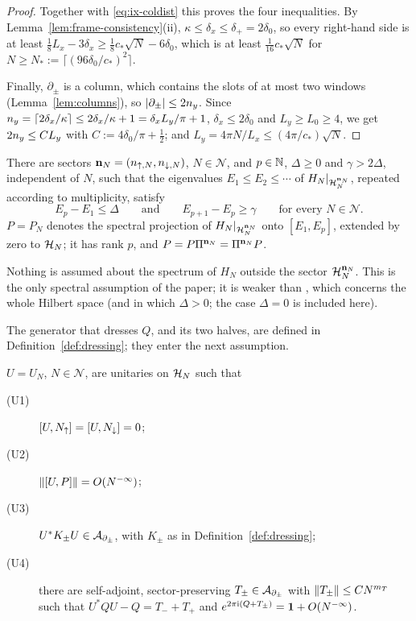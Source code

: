 \begin{proof}
Together with \eqref{eq:ix-coldist} this proves the four inequalities. By Lemma~\ref{lem:frame-consistency}(ii),
$\kappa\le\delta_x\le\delta_+=2\delta_0$, so every right-hand side is at least
$\frac18L_x-3\delta_x\ge\frac18c_*\sqrt N-6\delta_0$, which is at least $\frac1{16}c_*\sqrt N$ for
$N\ge N_*:=\lceil(96\delta_0/c_*)^2\rceil$.

Finally, $\partial_\pm$ is a column, which contains the slots of at most two windows (Lemma~\ref{lem:columns}), so
$\lvert\partial_\pm\rvert\le2n_y$. Since $n_y=\lceil2\delta_x/\kappa\rceil\le2\delta_x/\kappa+1=\delta_xL_y/\pi+1$,
$\delta_x\le2\delta_0$ and $L_y\ge L_0\ge4$, we get $2n_y\le CL_y$ with $C:=4\delta_0/\pi+\frac12$; and
$L_y=4\pi N/L_x\le(4\pi/c_*)\sqrt N$.
\end{proof}

\begin{assumption}\label{ass:gap}
There are sectors $\mathbf{n}_N=(n_{{\uparrow},N},n_{{\downarrow},N})$, $N\in\mathcal N$, and $p\in\mathbb{N}$, $\Delta\ge0$ and $\gamma>2\Delta$,
independent of $N$, such that the eigenvalues $E_1\le E_2\le\cdots$ of $H_N|_{\mathcal{H}_N^{\mathbf{n}_N}}$, repeated according to
multiplicity, satisfy
\[
E_p-E_1\le\Delta\qquad\text{and}\qquad E_{p+1}-E_p\ge\gamma\qquad\text{for every }N\in\mathcal N .
\]
$P=P_N$ denotes the spectral projection of $H_N|_{\mathcal{H}_N^{\mathbf{n}_N}}$ onto $[E_1,E_p]$, extended by zero to $\mathcal{H}_N$; it
has rank $p$, and $P=P\Pi^{\mathbf{n}_N}=\Pi^{\mathbf{n}_N}P$.
\end{assumption}

Nothing is assumed about the spectrum of $H_N$ outside the sector $\mathcal{H}_N^{\mathbf{n}_N}$. This is the only spectral
assumption of the paper; it is weaker than \cite[Assumption~1]{BBDF21}, which concerns the whole Hilbert space
(and in which $\Delta>0$; the case $\Delta=0$ is included here).

The generator that dresses $Q$, and its two halves, are defined in Definition~\ref{def:dressing}; they enter
the next assumption.

\begin{assumption}\label{ass:U}
$U=U_N$, $N\in\mathcal N$, are unitaries on $\mathcal{H}_N$ such that
\begin{description}
\item[(U1)] $[U,N_{\uparrow}]=[U,N_{\downarrow}]=0$;
\item[(U2)] $\lVert[U,P]\rVert=O(N^{-\infty})$;
\item[(U3)] $U^*K_\pm U\in\mathcal{A}_{\partial_\pm}$, with $K_\pm$ as in Definition~\ref{def:dressing};
\item[(U4)] there are self-adjoint, sector-preserving $T_\pm\in\mathcal{A}_{\partial_\pm}$ with $\lVert T_\pm\rVert\le CN^{m_T}$ such that
$U^*QU-Q=T_-+T_+$ and $e^{2\pi\mathrm{i}(Q+T_\pm)}=\mathbf{1}+O(N^{-\infty})$.
\end{description}
\end{assumption}

